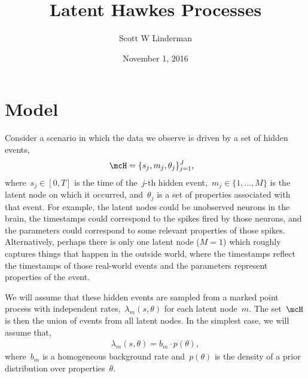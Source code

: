


\usepackage{macros}


\title{Latent Hawkes Processes}
\author{Scott W Linderman}
\date{November 1, 2016}


\maketitle

\section{Model}
Consider a scenario in which the data we observe is driven by
a set of hidden events,
\begin{align}
  \mcH &= \{s_j, m_j, \theta_j\}_{j=1}^J,
\end{align}
where~$s_j \in [0,T]$ is the time of the~$j$-th hidden
event,~${m_j \in \{1, \ldots, M\}}$ is the latent node on which it
occurred, and~$\theta_j$ is a set of properties associated with that
event. For example, the latent nodes could be unobserved neurons in
the brain, the timestamps could correspond to the spikes fired by
those neurons, and the parameters could correspond to some relevant
properties of those spikes. Alternatively, perhaps there is only one
latent node ($M=1$) which roughly captures things that happen in the
outside world, where the timestamps reflect the timestamps of those
real-world events and the parameters represent properties of the
event.

We will assume that these hidden events are sampled from a
marked point process with independent rates,~$\lambda_m(s,\theta)$
for each latent node~$m$. The set~$\mcH$ is then the union of
events from all latent nodes. In the simplest case, we will assume
that,
\begin{align}
  \lambda_m(s, \theta) = b_m \cdot p(\theta),
\end{align}
where~$b_m$ is a homogeneous background rate and~$p(\theta)$ is
the density of a prior distribution over properties~$\theta$. 

